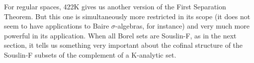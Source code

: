{For regular spaces, 422K gives us another version of the First
Separation Theorem.   But this one is simultaneously more restricted in
its scope (it does not seem to have applications to Baire
$\sigma$-algebras, for instance) and very much more powerful in its
application.   When all Borel sets are Souslin-F, as in the next
section, it tells us something very important about the cofinal
structure of the Souslin-F subsets of the complement of a K-analytic
set.
}%

\discrpage


